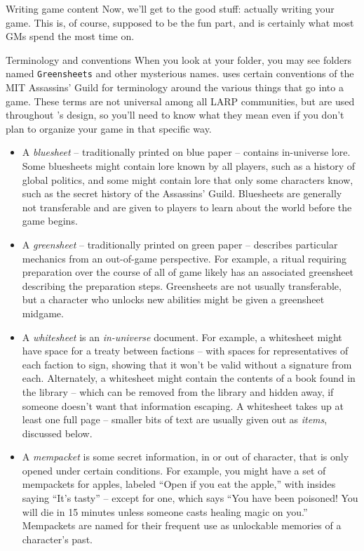 \documentclass{article}
\begin{document}
\begin{section}{Writing game content}
Now, we'll get to the good stuff: actually writing your game.  This is, of course, supposed to be the fun part, and is certainly what most GMs spend the most time on.

\begin{subsection}{Terminology and conventions}
When you look at your \gametex{} folder, you may see folders named \texttt{Greensheets} and other mysterious names.  \gametex{} uses certain conventions of the MIT Assassins' Guild for terminology around the various things that go into a game.  These terms are not universal among all LARP communities, but are used throughout \gametex{}'s design, so you'll need to know what they mean even if you don't plan to organize your game in that specific way.
\begin{itemize}
    \item A \textit{bluesheet} -- traditionally printed on blue paper -- contains in-universe lore.  Some bluesheets might contain lore known by all players, such as a history of global politics, and some might contain lore that only some characters know, such as the secret history of the Assassins' Guild.  Bluesheets are generally not transferable and are given to players to learn about the world before the game begins.
    \item A \textit{greensheet} -- traditionally printed on green paper -- describes particular mechanics from an out-of-game perspective.  For example, a ritual requiring preparation over the course of all of game likely has an associated greensheet describing the preparation steps.  Greensheets are not usually transferable, but a character who unlocks new abilities might be given a greensheet midgame.
    \item A \textit{whitesheet} is an \emph{in-universe} document.  For example, a whitesheet might have space for a treaty between factions -- with spaces for representatives of each faction to sign, showing that it won't be valid without a signature from each.  Alternately, a whitesheet might contain the contents of a book found in the library -- which can be removed from the library and hidden away, if someone doesn't want that information escaping.  A whitesheet takes up at least one full page – smaller bits of text are usually given out as \textit{items}, discussed below.
    \item A \textit{mempacket} is some secret information, in or out of character, that is only opened under certain conditions.  For example, you might have a set of mempackets for apples, labeled ``Open if you eat the apple,'' with insides saying ``It's tasty'' -- except for one, which says ``You have been poisoned!  You will die in 15 minutes unless someone casts healing magic on you.'' Mempackets are named for their frequent use as unlockable memories of a character's past.

\end{itemize}
\end{subsection}
\end{section}
\end{document}
